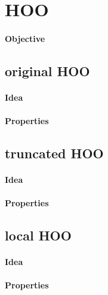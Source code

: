 \documentclass[a4paper,11pt,titlepage]{article}
\begin{document}
\section{HOO}
\paragraph{Objective}
\subsection{original HOO}
\paragraph{Idea}
\paragraph{Properties}
\subsection{truncated HOO}
\paragraph{Idea}
\paragraph{Properties}
\subsection{local HOO}
\paragraph{Idea}
\paragraph{Properties}
\end{document}
